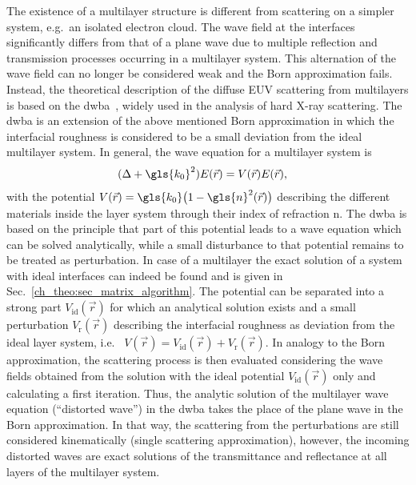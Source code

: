 The existence of a multilayer structure is different from scattering on a simpler system, e.g.~an isolated electron cloud. The wave field at the interfaces significantly differs from that of a plane wave due to multiple reflection and transmission processes occurring in a multilayer system. This alternation of the wave field can no longer be considered weak and the Born approximation fails. Instead, the theoretical description of the diffuse EUV scattering from multilayers is based on the \gls{dwba}~\cite{holy_nonspecular_1994,holy_x-ray_1993}, widely used in the analysis of hard X-ray scattering. The \gls{dwba} is an extension of the above mentioned Born approximation in which the interfacial roughness is considered to be a small deviation from the ideal multilayer system. In general, the wave equation for a multilayer system is
\begin{align}
        (\Delta + \gls{k_0}^2) E(\vec{r}) &= V(\vec{r}) E(\vec{r})\text{,} \label{ch_theo:eqn_multilayer_wave_equation} 
\end{align}
with the potential $V(\vec{r}) = \gls{k_0}\big(1-\gls{n}^2(\vec{r})\big)$ \cite{pietsch_high-resolution_2004} describing the different materials inside the layer system through their index of refraction \gls{n}. The \gls{dwba} is based on the principle that part of this potential leads to a wave equation which can be solved analytically, while a small disturbance to that potential remains to be treated as perturbation. In case of a multilayer the exact solution of a system with ideal interfaces can indeed be found and is given in Sec.~\ref{ch_theo:sec_matrix_algorithm}. The potential can be separated into a strong part $V_\text{id}(\vec{r})$ for which an analytical solution exists and a small perturbation $V_\text{r}(\vec{r})$ describing the interfacial roughness as deviation from the ideal layer system, i.e.~  $V(\vec{r}) = V_\text{id}(\vec{r}) + V_\text{r}(\vec{r})$. In analogy to the Born approximation, the scattering process is then evaluated considering the wave fields obtained from the solution with the ideal potential $V_\text{id}(\vec{r})$ only and calculating a first iteration. Thus, the analytic solution of the multilayer wave equation (``distorted wave'') in the \gls{dwba} takes the place of the plane wave in the Born approximation. In that way, the scattering from the perturbations are still considered kinematically (single scattering approximation), however, the incoming distorted waves are exact solutions of the transmittance and reflectance at all layers of the multilayer system.

